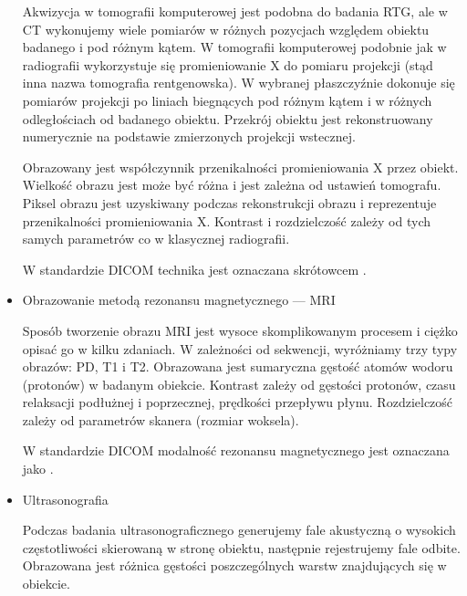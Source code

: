 \begin{itemize}
          Akwizycja w tomografii komputerowej jest podobna do badania RTG, ale w CT wykonujemy wiele pomiarów w różnych pozycjach względem obiektu badanego i pod różnym kątem.
          W tomografii komputerowej podobnie jak w radiografii wykorzystuje się promieniowanie X do pomiaru projekcji (stąd inna nazwa tomografia rentgenowska).
          W wybranej płaszczyźnie dokonuje się pomiarów projekcji po liniach biegnących pod różnym kątem i w różnych odległościach od badanego obiektu.
          Przekrój obiektu jest rekonstruowany numerycznie na podstawie zmierzonych projekcji wstecznej.

          Obrazowany jest współczynnik przenikalności promieniowania X przez obiekt.
          Wielkość obrazu jest może być różna i jest zależna od ustawień tomografu.
          Piksel obrazu jest uzyskiwany podczas rekonstrukcji obrazu i reprezentuje przenikalności promieniowania X.
          Kontrast i rozdzielczość zależy od tych samych parametrów co w klasycznej radiografii.

          W standardzie DICOM technika jest oznaczana skrótowcem .

    \item Obrazowanie metodą rezonansu magnetycznego --- MRI

          Sposób tworzenie obrazu MRI jest wysoce skomplikowanym procesem i ciężko opisać go w kilku zdaniach.
          W zależności od sekwencji, wyróżniamy trzy typy obrazów: PD, T1 i T2.
          Obrazowana jest sumaryczna gęstość atomów wodoru (protonów) w badanym obiekcie.
          Kontrast zależy od gęstości protonów, czasu relaksacji podłużnej i poprzecznej, prędkości przepływu płynu.
          Rozdzielczość zależy od parametrów skanera (rozmiar woksela).

          W standardzie DICOM modalność rezonansu magnetycznego jest oznaczana jako .

    \item Ultrasonografia

          Podczas badania ultrasonograficznego generujemy fale akustyczną o wysokich częstotliwości skierowaną w stronę obiektu, następnie rejestrujemy fale odbite.
          Obrazowana jest różnica gęstości poszczególnych warstw znajdujących się w obiekcie.


\end{itemize}
